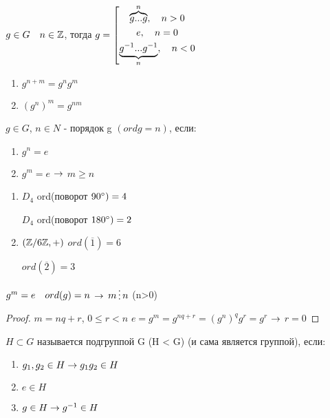 \documentclass[main, 12pt, fleqn]{subfiles}
\begin{document}
\begin{definition}
    $g \in G \quad n \in \mathbb{Z}$, тогда $g=
\left[ 
  \begin{gathered} 
    \overbrace{g...g}^n, \quad n>0\\
    e, \quad n=0\\ 
    \underbrace{g^{-1}...g^{-1}}_n, \quad n<0
  \end{gathered} 
\right.$
\end{definition}

\begin{theorem}[св-ва]
    \begin{enumerate}                               
    	\item $g^{n+m}=g^n g^m$
    	\item $(g^n)^m=g^{n m}$
	\end{enumerate} 
\end{theorem}

\begin{definition}
    $g \in G$, $n \in N$ - порядок g $(ord g = n)$, если:
    \begin{enumerate}                               
    	\item $g^n=e$
    	\item $g^m=e$ $\rightarrow$ $m \geqslant n$
	\end{enumerate} 
\end{definition}

\begin{examples}
    \begin{enumerate}                               
    	\item $D_4$ ord(поворот $90\degree) =4$
    	
    	$D_4$ ord(поворот $180\degree) =2$
    	\item $(\mathbb{Z} /6 \mathbb{Z}, +)$ $ord(\overline{1})=6$
    	
    	$ord(\overline{2})=3$
	\end{enumerate} 
\end{examples}

\begin{utv}
    $g^m=e \quad ord(g)=n$ $\rightarrow$ $m \devides n$ (n>0)
\end{utv}

\begin{proof}
    $m=n q+r$, $0 \leqslant r < n$
    $e=g^m=g^{n q + r}=(g^n)^q g^r=g^r$ $\rightarrow$ $r=0$
\end{proof}

\begin{definition}
    $H \subset G$ называется подгруппой G (H < G) (и сама является группой), если:
    \begin{enumerate}                               
    	\item $g_1,g_2 \in H \rightarrow g_1 g_2 \in H$
    	\item $e \in H$
    	\item $g \in H \rightarrow g^{-1} \in H$
	\end{enumerate} 
\end{definition}
\end{document}
